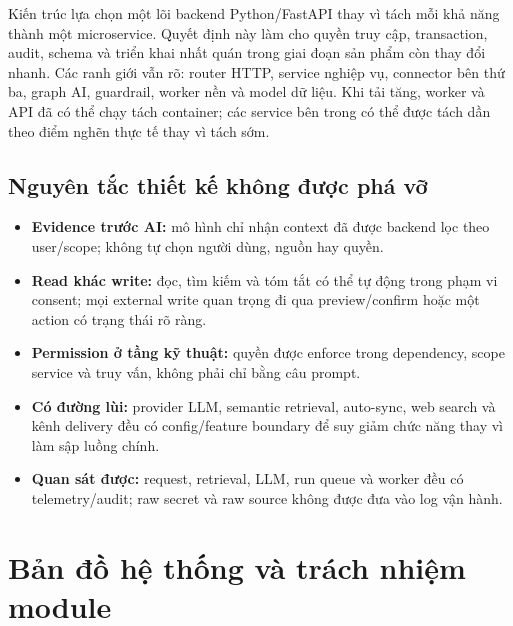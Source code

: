 \documentclass[11pt,a4paper]{article}
\begin{document}
Kiến trúc lựa chọn một lõi backend Python/FastAPI thay vì tách mỗi khả năng thành một microservice. Quyết định này làm cho quyền truy cập, transaction, audit, schema và triển khai nhất quán trong giai đoạn sản phẩm còn thay đổi nhanh. Các ranh giới vẫn rõ: router HTTP, service nghiệp vụ, connector bên thứ ba, graph AI, guardrail, worker nền và model dữ liệu. Khi tải tăng, worker và API đã có thể chạy tách container; các service bên trong có thể được tách dần theo điểm nghẽn thực tế thay vì tách sớm.

\subsection{Nguyên tắc thiết kế không được phá vỡ}
\begin{itemize}
  \item \textbf{Evidence trước AI:} mô hình chỉ nhận context đã được backend lọc theo user/scope; không tự chọn người dùng, nguồn hay quyền.
  \item \textbf{Read khác write:} đọc, tìm kiếm và tóm tắt có thể tự động trong phạm vi consent; mọi external write quan trọng đi qua preview/confirm hoặc một action có trạng thái rõ ràng.
  \item \textbf{Permission ở tầng kỹ thuật:} quyền được enforce trong dependency, scope service và truy vấn, không phải chỉ bằng câu prompt.
  \item \textbf{Có đường lùi:} provider LLM, semantic retrieval, auto-sync, web search và kênh delivery đều có config/feature boundary để suy giảm chức năng thay vì làm sập luồng chính.
  \item \textbf{Quan sát được:} request, retrieval, LLM, run queue và worker đều có telemetry/audit; raw secret và raw source không được đưa vào log vận hành.
\end{itemize}

\section{Bản đồ hệ thống và trách nhiệm module}
\end{document}
